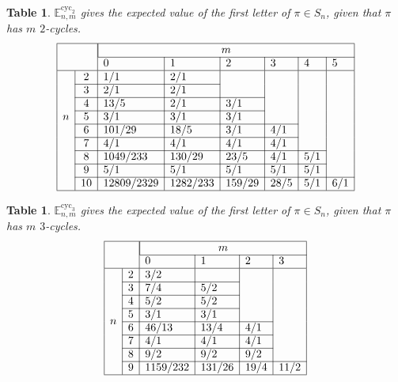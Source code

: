 \documentclass{article}
\newcommand{\n}[1]{\multicolumn{1}{|c|}{#1}}
\numberwithin{equation}{subsection}
\newtheorem{datatable}[theo]{Table}
\begin{document}
\begin{datatable} $\mathbb{E}_{n,m}^{\text{cyc}_2}$ gives the expected value of the first letter of
  $\pi \in S_n$, given that $\pi$ has $m$ $2$-cycles.
\begin{equation}
  \begin{array}{|ll|l|l|l|l|l|l|l|}
  \hline
  & & \multicolumn{6}{|c|}{m} \\ \cline{3-8}
  & & 0 & 1 & 2 & 3 & 4 & 5 \\ \hline
  \multirow{7}{*}{$n$}
  & \n{2}  & 1/1        & 2/1      &        &      &     &     \\ \cline{2-4}
  & \n{3}  & 2/1        & 2/1      &        &      &     &     \\ \cline{2-5}
  & \n{4}  & 13/5       & 2/1      & 3/1    &      &     &     \\ \cline{2-5}
  & \n{5}  & 3/1        & 3/1      & 3/1    &      &     &     \\ \cline{2-6}
  & \n{6}  & 101/29     & 18/5     & 3/1    & 4/1  &     &     \\ \cline{2-6}
  & \n{7}  & 4/1        & 4/1      & 4/1    & 4/1  &     &     \\ \cline{2-7}
  & \n{8}  & 1049/233   & 130/29   & 23/5   & 4/1  & 5/1 &     \\ \cline{2-7}
  & \n{9}  & 5/1        & 5/1      & 5/1    & 5/1  & 5/1 &     \\ \cline{2-8}
  & \n{10} & 12809/2329 & 1282/233 & 159/29 & 28/5 & 5/1 & 6/1 \\ \hline
  \end{array}
\end{equation}
\end{datatable}
\begin{datatable} $\mathbb{E}_{n,m}^{\text{cyc}_3}$ gives the expected value of the first letter of
  $\pi \in S_n$, given that $\pi$ has $m$ $3$-cycles.
\begin{equation}
  \begin{array}{|ll|l|l|l|l|l|l|l|l|l|l|}
  \hline
  & & \multicolumn{4}{|c|}{m} \\ \cline{3-6}
  & & 0 & 1 & 2 & 3 \\ \hline
  \multirow{8}{*}{$n$}
  & \n{2} & 3/2      &        &      &      \\ \cline{2-4}
  & \n{3} & 7/4      & 5/2    &      &      \\ \cline{2-4}
  & \n{4} & 5/2      & 5/2    &      &      \\ \cline{2-4}
  & \n{5} & 3/1      & 3/1    &      &      \\ \cline{2-5}
  & \n{6} & 46/13    & 13/4   & 4/1  &      \\ \cline{2-5}
  & \n{7} & 4/1      & 4/1    & 4/1  &      \\ \cline{2-5}
  & \n{8} & 9/2      & 9/2    & 9/2  &      \\ \cline{2-6}
  & \n{9} & 1159/232 & 131/26 & 19/4 & 11/2 \\ \hline
  \end{array}
\end{equation}
\end{datatable}
\end{document}
